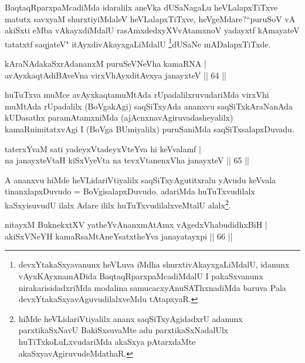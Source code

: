 \begin{artha}
BaqtaqRparxpaMcadiMda idaralilx aneVka dUSaNagaLu heVLalapxTiTxve matutx savxyaM 
shurxtiyiMdaleV heVLalapxTiTxve, heVgeMdare?``puruSoV vA akiSxti eMba vAkayxdiMdalU rasAmxdedxyXV\s \s vAtamxnoV yadayxtf kAmayateV tatatxtf saqjateV" itAyxdivAkayxgaLiMdalU
\footnote{devxYtakaSxyavanunx heVLuva iMdha shurxtivAkayxgaLiMdalU, idanunx vAyxKAyxnamADida BaqtaqRparxpaMcadiMdalU I pakaSxvanunx nirakarisidadxriMda modalina samucacxyAnuSAThxnadiMda baruva Pala  devxYtakaSxyavAguvudilalxveMdu tAtapxyaR.}dUSaNe mADalapxTiTxde.
\end{artha}


\begin{shl}
kAraNAdakaSxrAdananxM puruSeVNeVha kamaRNA |\\
avAyxkaqtAdiBAveVna virxVhAyxditAvxya janayxteV \hfill || 64 ||
\end{shl}

\begin{artha}
huTuTxva muMce avAyxkaqtamuMtAda rUpadalilxruvudariMda virxVhi muMtAda rUpadalilx (BoVgakAgi) saqSiTxyAda ananxvu saqSiTxkAraNanAda kUDasathx paramAtamxniMda (ajAcnxnavAgiruvadasheyalilx) kamaRnimitatxvAgi I (BoVga BUmiyalilx) puruSaniMda saqSiTxsalapxDuvadu.
\end{artha}


\begin{shl}
taterxYvaM sati yadeyxVtadeyxVteYva hi keVvalamf |\\
na janayxteV\s taH kiSxVyeVta na tevxVtanenxVha janayxteV \hfill || 65 ||
\end{shl}

\begin{artha}
A ananxvu hiMde heVLidariVtiyalilx saqSiTxyAgutitxralu yAvudu keVvala tinanxlapxDuvudo = BoVgisalapxDuvudo. adariMda huTuTxvudilalx kaSxyisuvudU ilalx Adare ililx huTuTxvudilalxveMtalU alalx\footnote{hiMde heVLidariVtiyalilx ananx saqSiTxyAgidadxrU adanunx parxtikaSxNavU BakiSxsuvaMte adu parxtikaSxNadalUlx huTiTxkoLuLxvudariMda akaSxya pAtarxdaMte akaSxyavAgiruvudeMdathaR.}.
\end{artha}


\begin{shl}
nitayxM BuknekxtXV yatheYvAnanxmAtAmx vAgedxVhabudidhxBiH |\\
akiSxVNeYH kamaRsaMtAneYsatxtheYva janayatayxpi \hfill || 66 ||
\end{shl}

